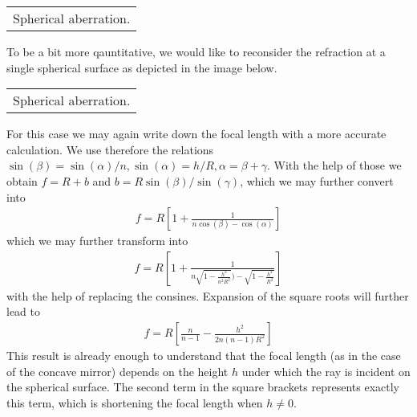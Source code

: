 \documentclass[letterpaper,10pt,english]{sphinxmanual}
\begin{document}
\begin{savenotes}\sphinxattablestart
\centering
\begin{tabulary}{\linewidth}[t]{|T|}
\hline
\sphinxstyletheadfamily 
{} 
\\
\hline
{} Spherical aberration.
\\
\hline
\end{tabulary}
\par
\sphinxattableend\end{savenotes}

To be a bit more qauntitative, we would like to reconsider the refraction at a single spherical surface as depicted in the image below.


\begin{savenotes}\sphinxattablestart
\centering
\begin{tabulary}{\linewidth}[t]{|T|}
\hline
\sphinxstyletheadfamily 
{}
\\
\hline
{} Spherical aberration.
\\
\hline
\end{tabulary}
\par
\sphinxattableend\end{savenotes}

For this case we may again write down the focal length with a more accurate calculation. We use therefore the relations \(\sin(\beta)=\sin(\alpha)/n, \sin(\alpha)=h/R, \alpha=\beta+\gamma\). With the help of those we obtain \(f=R+b\) and \(b=R\sin(\beta)/\sin(\gamma)\), which we may further convert into
\begin{equation*}
\begin{split}f=R\left [ 1+ \frac{1}{n\cos(\beta)-\cos(\alpha)}\right ]\end{split}
\end{equation*}
which we may further transform into
\begin{equation*}
\begin{split}f=R\left [ 1+ \frac{1}{n\sqrt{1-\frac{h^2}{n^2 R^2}})-\sqrt{1-\frac{h^2}{R^2}}}\right ]\end{split}
\end{equation*}
with the help of replacing the consines. Expansion of the square roots will further lead to
\begin{equation*}
\begin{split}f=R\left [ \frac{n}{n-1}- \frac{h^2}{2n(n-1)R^2} \right]\end{split}
\end{equation*}
This result is already enough to understand that the focal length (as in the case of the concave mirror) depends on the height \(h\) under which the ray is incident on the spherical surface. The second term in the square brackets represents exactly this term, which is shortening the focal length when \(h\neq 0\).
\end{document}
